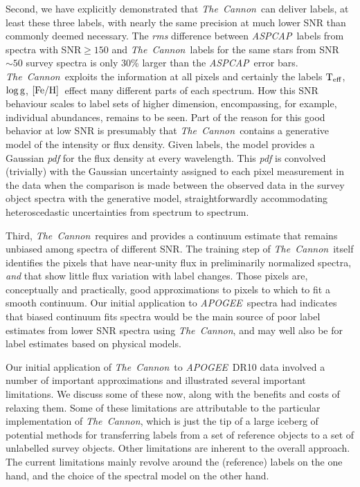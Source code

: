 \documentclass[12pt, preprint]{aastex}
\newcommand{\tc}{\textsl{The~Cannon}}
\newcommand{\apogee}{\textsl{APOGEE}}
\newcommand{\aspcap}{\textsl{ASPCAP}}
\newcommand{\teff}{\mbox{$\rm T_{eff}$}}
\newcommand{\feh}{\mbox{$\rm [Fe/H]$}}
\newcommand{\logg}{\mbox{$\rm \log g$}}
\begin{document}
Second, we have explicitly demonstrated that \tc\ can deliver labels, at least these three labels, 
with nearly the same precision at much lower SNR than commonly deemed necessary. 
The \textit{rms} difference between  \aspcap\ labels from spectra with SNR$\ge150$ and \tc\ labels
for the same stars from SNR$ \sim 50$ survey spectra is only 30\% larger than the \aspcap\ error bars. 
\tc\  exploits the information at all pixels and certainly the labels \teff, \logg, \feh\  effect many different parts of each spectrum. How this SNR behaviour scales to label sets of higher dimension, encompassing, for example, individual abundances, remains to be seen. Part of the reason for this good behavior at low SNR is presumably that
\tc\ contains a generative model of the intensity or flux density.
Given labels, the model provides a Gaussian \textit{pdf} for the flux density at every wavelength.
This \textit{pdf} is convolved (trivially) with the Gaussian uncertainty
assigned to each pixel measurement in the data when the comparison is
made between the observed data in the survey object spectra with the
generative model, straightforwardly accommodating
heteroscedastic uncertainties from spectrum to spectrum.

Third, \tc\ requires and provides a continuum estimate that remains  
unbiased among spectra of different SNR. The training step of \tc\ itself identifies the 
pixels that have near-unity flux in preliminarily normalized spectra, {\it and} that show little flux variation with 
label changes. Those pixels are, conceptually and practically, good approximations to pixels to which to fit a smooth continuum. Our initial application to \apogee\ spectra had indicates that biased continuum fits spectra would be the main source of poor label estimates from lower SNR spectra using \tc , and may well also be for label estimates based on physical models. 

Our initial application of \tc\ to \apogee\  DR10 data involved a number of important approximations and illustrated several important limitations. 
We discuss some of these now, along with the benefits and costs of relaxing
them. Some of these limitations are attributable to the 
particular implementation of \tc , which is just the tip of a large iceberg of potential
methods for transferring labels from a set of reference objects to a
set of unlabelled survey objects. Other limitations are inherent to the overall approach. 
The current limitations mainly revolve around the (reference) labels on the one hand, and the choice 
of the spectral model on the other hand. 
\end{document}
